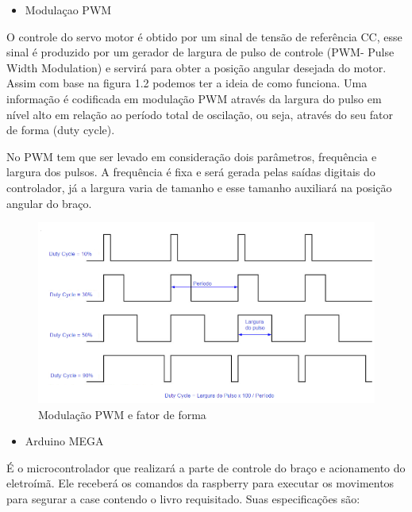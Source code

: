 \begin{itemize}
\item{Modulaçao PWM}
\end{itemize}

O controle do servo motor é obtido por um sinal de tensão de referência CC, esse sinal é produzido por um gerador de largura de pulso de controle (PWM- Pulse Width Modulation) e servirá para obter a posição angular desejada do motor. Assim com base na figura 1.2 podemos ter a ideia de como funciona. Uma informação é codificada em modulação PWM através da largura do pulso em nível alto em relação ao período total de oscilação, ou seja, através do seu fator de forma (duty cycle).

No PWM tem que ser levado em consideração dois parâmetros, frequência e largura dos pulsos. A frequência é fixa e será gerada pelas saídas digitais do controlador, já a largura varia de tamanho e esse tamanho auxiliará na posição angular do braço.

\begin{figure}[!h]
\centering
\includegraphics[scale=0.65, angle = 360]{figuras/lala3}
\caption[]{Modulação PWM e fator de forma}
\end{figure}
\FloatBarrier

\begin{itemize}
\item{Arduino MEGA}
\end{itemize}

É o microcontrolador que realizará a parte de controle do braço e acionamento do eletroímã. Ele receberá os comandos da raspberry para executar os movimentos para segurar a case contendo o livro requisitado. Suas especificações são:

